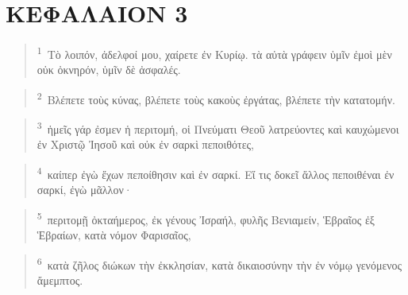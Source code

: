 \documentclass{article}
\newcommand{\currentverse}{1} %
\newcommand{\setcurrentverse}[1]{\renewcommand{\currentverse}{#1}}
\begin{document}
\section*{ΚΕΦΑΛΑΙΟΝ 3}

\begin{verse}

\setcurrentverse{1}

\setcounter{footnote}{0}

\textsuperscript{1}~Τὸ λοιπόν, ἀδελφοί μου, χαίρετε ἐν Κυρίῳ. τὰ αὐτὰ γράφειν ὑμῖν ἐμοὶ μὲν οὐκ ὀκνηρόν, ὑμῖν δὲ ἀσφαλές.

\end{verse}

\begin{verse}

\setcurrentverse{2}

\setcounter{footnote}{0}

\textsuperscript{2}~Βλέπετε τοὺς κύνας, βλέπετε τοὺς κακοὺς ἐργάτας, βλέπετε τὴν κατατομήν.

\end{verse}

\begin{verse}

\setcurrentverse{3}

\setcounter{footnote}{0}

\textsuperscript{3}~ἡμεῖς γάρ ἐσμεν ἡ περιτομή, οἱ Πνεύματι Θεοῦ λατρεύοντες καὶ καυχώμενοι ἐν Χριστῷ Ἰησοῦ καὶ οὐκ ἐν σαρκὶ πεποιθότες,

\end{verse}

\begin{verse}

\setcurrentverse{4}

\setcounter{footnote}{0}

\textsuperscript{4}~καίπερ ἐγὼ ἔχων πεποίθησιν καὶ ἐν σαρκί. Εἴ τις δοκεῖ ἄλλος πεποιθέναι ἐν σαρκί, ἐγὼ μᾶλλον·

\end{verse}

\begin{verse}

\setcurrentverse{5}

\setcounter{footnote}{0}

\textsuperscript{5}~περιτομῇ ὀκταήμερος, ἐκ γένους Ἰσραήλ, φυλῆς Βενιαμείν, Ἑβραῖος ἐξ Ἑβραίων, κατὰ νόμον Φαρισαῖος,

\end{verse}

\begin{verse}

\setcurrentverse{6}

\setcounter{footnote}{0}

\textsuperscript{6}~κατὰ ζῆλος διώκων τὴν ἐκκλησίαν, κατὰ δικαιοσύνην τὴν ἐν νόμῳ γενόμενος ἄμεμπτος.

\end{verse}
\end{document}
